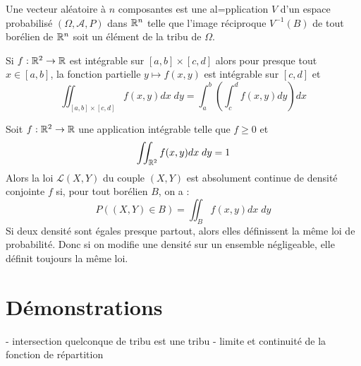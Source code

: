 







\begin{definition}
    Une vecteur aléatoire à $n$ composantes est une al=pplication $V$ d'un espace probabilisé $(\Omega, \mathcal{A}, P)$ dans $\mathbb{R}^n$ telle que l'image réciproque $V^{-1}(B)$ de tout borélien de $\mathbb{R}^n$ soit un élément de la tribu de $\Omega$.
\end{definition}

\begin{theorem}[Fubini]
    Si $ f : \mathbb{R}^2 \rightarrow \mathbb{R} $ est intégrable sur $[a, b] \times [c, d]$ alors pour presque tout $x \in [a, b]$, la fonction partielle $ y \mapsto f(x, y)$ est intégrable sur $[c, d]$ et 
        \[ \iint_{[a, b] \times [c, d]} f(x, y) dx \; dy = \int_{a}^{b} \left( \int_{c}^{d} f(x, y) dy \right) dx \]
\end{theorem}

\begin{definition}
    Soit $ f : \mathbb{R}^2 \rightarrow \mathbb{R} $ une application intégrable telle que $f \geq 0$ et 
        \[ \iint_{\mathbb{R}^2} f(x, y) dx \; dy = 1 \]
    Alors la loi $\mathcal{L}(X, Y)$ du couple $(X, Y)$ est absolument continue de densité conjointe $f$ si, pour tout borélien $B$, on a :
        \[ P((X, Y) \in B) = \iint_B f(x, y) dx \; dy \]
    Si deux densité sont égales presque partout, alors elles définissent la même loi de probabilité. Donc si on modifie une densité sur un ensemble négligeable, elle définit toujours la même loi.
\end{definition}













\section*{Démonstrations}

- intersection quelconque de tribu est une tribu
- limite et continuité de la fonction de répartition


